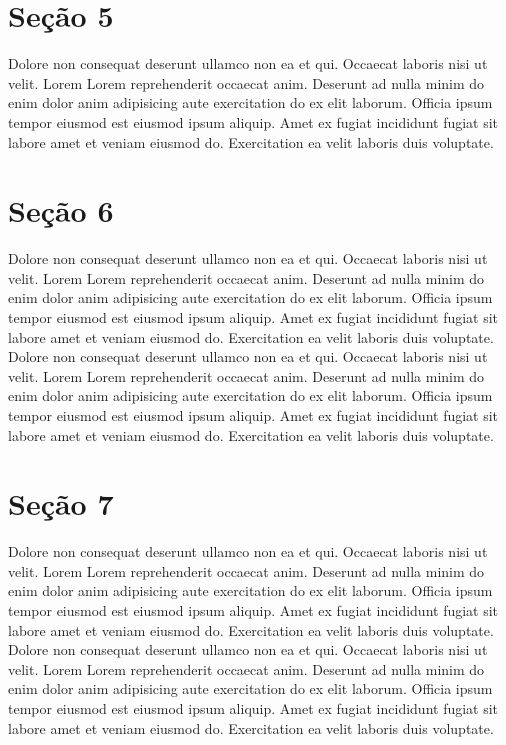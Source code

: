 \documentclass[12pt]{report}
\begin{document}
\begin{multicols}{3}
    \section{Seção 5}

    Dolore non consequat deserunt ullamco non ea et qui. Occaecat laboris nisi ut velit. Lorem Lorem reprehenderit occaecat anim. Deserunt ad nulla minim do enim dolor anim adipisicing aute exercitation do ex elit laborum. Officia ipsum tempor eiusmod est eiusmod ipsum aliquip. Amet ex fugiat incididunt fugiat sit labore amet et veniam eiusmod do. Exercitation ea velit laboris duis voluptate.

    \section{Seção 6}

    Dolore non consequat deserunt ullamco non ea et qui. Occaecat laboris nisi ut velit. Lorem Lorem reprehenderit occaecat anim. Deserunt ad nulla minim do enim dolor anim adipisicing aute exercitation do ex elit laborum. Officia ipsum tempor eiusmod est eiusmod ipsum aliquip. Amet ex fugiat incididunt fugiat sit labore amet et veniam eiusmod do. Exercitation ea velit laboris duis voluptate.
    Dolore non consequat deserunt ullamco non ea et qui. Occaecat laboris nisi ut velit. Lorem Lorem reprehenderit occaecat anim. Deserunt ad nulla minim do enim dolor anim adipisicing aute exercitation do ex elit laborum. Officia ipsum tempor eiusmod est eiusmod ipsum aliquip. Amet ex fugiat incididunt fugiat sit labore amet et veniam eiusmod do. Exercitation ea velit laboris duis voluptate.

    \section{Seção 7}

    Dolore non consequat deserunt ullamco non ea et qui. Occaecat laboris nisi ut velit. Lorem Lorem reprehenderit occaecat anim. Deserunt ad nulla minim do enim dolor anim adipisicing aute exercitation do ex elit laborum. Officia ipsum tempor eiusmod est eiusmod ipsum aliquip. Amet ex fugiat incididunt fugiat sit labore amet et veniam eiusmod do. Exercitation ea velit laboris duis voluptate.
    Dolore non consequat deserunt ullamco non ea et qui. Occaecat laboris nisi ut velit. Lorem Lorem reprehenderit occaecat anim. Deserunt ad nulla minim do enim dolor anim adipisicing aute exercitation do ex elit laborum. Officia ipsum tempor eiusmod est eiusmod ipsum aliquip. Amet ex fugiat incididunt fugiat sit labore amet et veniam eiusmod do. Exercitation ea velit laboris duis voluptate.
\end{multicols}
\end{document}
